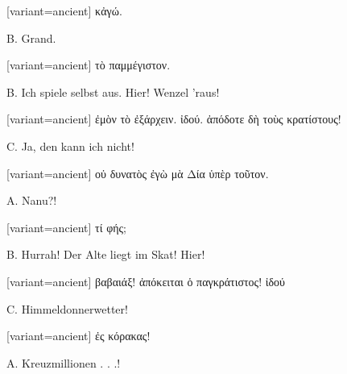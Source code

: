 \switchcolumn

\begin{greek}[variant=ancient]%
κἀγώ.

\end{greek}%
\switchcolumn*

B. Grand.

\switchcolumn

\begin{greek}[variant=ancient]%
τὸ παμμέγιστον.

\end{greek}%
\switchcolumn*

B. Ich spiele selbst aus. Hier! Wenzel 'raus!

\switchcolumn

\begin{greek}[variant=ancient]%
ἐμὸν τὸ ἐξάρχειν. ἰδού. ἀπόδοτε δὴ τοὺς κρατίστους!

\end{greek}%
\switchcolumn*

C. Ja, den kann ich nicht!

\switchcolumn

\begin{greek}[variant=ancient]%
οὐ δυνατὸς ἐγὼ μὰ Δία ὑπὲρ τοῦτον.

\end{greek}%
\switchcolumn*

A. Nanu?!

\switchcolumn

\begin{greek}[variant=ancient]%
τί φής;

\end{greek}%
\switchcolumn*

B. Hurrah! Der Alte liegt im Skat! Hier!

\switchcolumn

\begin{greek}[variant=ancient]%
βαβαιάξ! ἀπόκειται ὁ παγκράτιστος! ἰδού

\end{greek}%
\switchcolumn*

C. Himmeldonnerwetter!

\switchcolumn

\begin{greek}[variant=ancient]%
ἐς κόρακας!

\end{greek}%
\switchcolumn*

A. Kreuzmillionen . . .!

\switchcolumn


